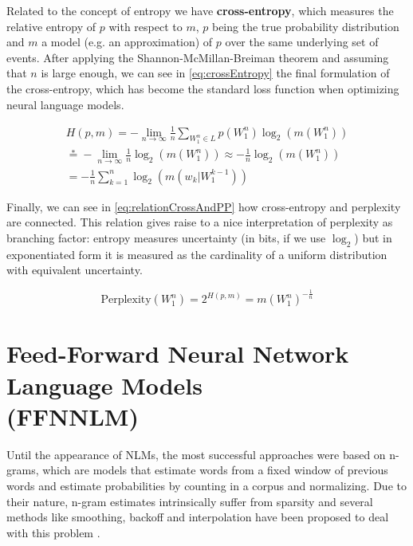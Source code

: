Related to the concept of entropy we have \textbf{cross-entropy}, which measures the relative entropy of $p$ with respect to $m$, $p$ being the true probability distribution and $m$ a model (e.g. an approximation) of $p$ over the same underlying set of events. After applying the Shannon-McMillan-Breiman theorem and assuming that $n$ is large enough, we can see in \autoref{eq:crossEntropy} the final formulation of the cross-entropy, which has become the standard loss function when optimizing neural language models.

\begin{equation} \label{eq:crossEntropy}
	\begin{gathered}
		H(p,m) = -\lim\limits_{n \rightarrow \infty}\frac{1}{n}\sum_{W_1^n \in L}p(W_1^n)\log_2(m(W_1^n)) \\
		\stackrel{*}{=} -\lim\limits_{n \rightarrow \infty}\frac{1}{n}\log_2(m(W_1^n)) \approx -\frac{1}{n}\log_2(m(W_1^n)) \\
		= -\frac{1}{n}\sum_{k=1}^{n}\log_2(m(w_k|W_{1}^{k-1}))
	\end{gathered}
\end{equation}

Finally, we can see in \autoref{eq:relationCrossAndPP} how cross-entropy and perplexity are connected. This relation gives raise to a nice interpretation of perplexity as branching factor: entropy measures uncertainty (in bits, if we use $\log_2$) but in exponentiated form it is measured as the cardinality of a uniform distribution with equivalent uncertainty.

\begin{equation} \label{eq:relationCrossAndPP}
	\text{Perplexity}(W_1^n) = 2^{H(p,m)} = m(W_1^n)^{-\frac{1}{n}}
\end{equation}

\section{Feed-Forward Neural Network Language Models \\ (FFNNLM)}
\label{sec:forwardnlm}

Until the appearance of NLMs, the most successful approaches were based on n-grams, which are models that estimate words from a fixed window of previous words and estimate probabilities by counting in a corpus and normalizing. Due to their nature, n-gram estimates intrinsically suffer from sparsity and several methods like smoothing, backoff and interpolation have been proposed to deal with this problem \cite{chen1996empirical}.

